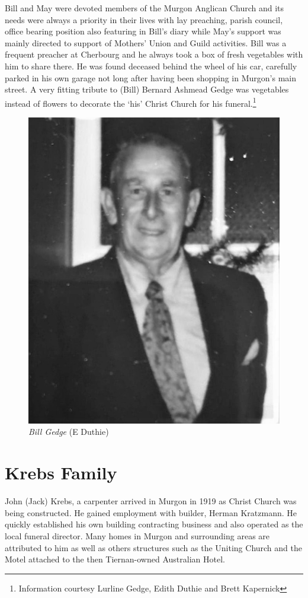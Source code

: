 Bill and May were devoted members of the Murgon Anglican Church and its needs were always a priority in their lives with lay preaching, parish council, office bearing position also featuring in Bill's diary while May's support was mainly directed to support of Mothers' Union and Guild activities. Bill was a frequent preacher at Cherbourg and he always took a box of fresh vegetables with him to share there. He was found deceased behind the wheel of his car, carefully parked in his own garage not long after having been shopping in Murgon's main street. A very fitting tribute to (Bill) Bernard Ashmead Gedge was vegetables instead of flowers to decorate the `his' Christ Church for his funeral.\footnote{Information courtesy Lurline Gedge, Edith Duthie and Brett Kapernick}








\begin{figure}
\begin{center}
\includegraphics[width=.6\linewidth,center]{../images/BillGedge.jpg}
\caption{{\itshape Bill Gedge} {\scriptsize(E Duthie)}}
\end{center}
\end{figure}




\section{Krebs Family}



John (Jack) Krebs, a carpenter arrived in Murgon in 1919 as Christ Church was being constructed. He gained employment with builder, Herman Kratzmann. He quickly established his own building contracting business and also operated as the local funeral director. Many homes in Murgon and surrounding areas are attributed to him as well as others structures such as the Uniting Church and the Motel attached to the then Tiernan-owned Australian Hotel.









